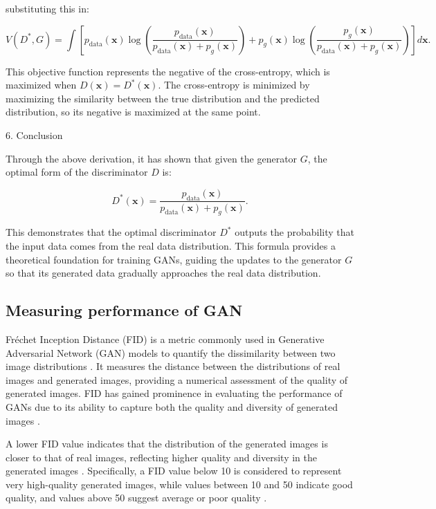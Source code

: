 substituting this in:

\begin{equation}
    V(D^*, G) = \int \left[ p_{\text{data}}(\mathbf{x}) \log \left( \frac{p_{\text{data}}(\mathbf{x})}{p_{\text{data}}(\mathbf{x}) + p_g(\mathbf{x})} \right) + p_g(\mathbf{x}) \log \left( \frac{p_g(\mathbf{x})}{p_{\text{data}}(\mathbf{x}) + p_g(\mathbf{x})} \right) \right] d\mathbf{x}.
\end{equation}

This objective function represents the negative of the cross-entropy, which is maximized when \( D(\mathbf{x}) = D^*(\mathbf{x}) \). The cross-entropy is minimized by maximizing the similarity between the true distribution and the predicted distribution, so its negative is maximized at the same point.

6. Conclusion

Through the above derivation, it has shown that given the generator \( G \), the optimal form of the discriminator \( D \) is:

\begin{equation}
    D^*(\mathbf{x}) = \frac{p_{\text{data}}(\mathbf{x})}{p_{\text{data}}(\mathbf{x}) + p_g(\mathbf{x})}.
\end{equation}

This demonstrates that the optimal discriminator \( D^* \) outputs the probability that the input data comes from the real data distribution. This formula provides a theoretical foundation for training GANs, guiding the updates to the generator \( G \) so that its generated data gradually approaches the real data distribution.


\subsection*{Measuring performance of GAN}


Fréchet Inception Distance (FID) is a metric commonly used in Generative Adversarial Network (GAN) models 
to quantify the dissimilarity between two image distributions \citep{10.48550/arxiv.2203.06026}. 
It measures the distance between the distributions of real images and generated images, providing 
a numerical assessment of the quality of generated images. FID has gained prominence in evaluating 
the performance of GANs due to its ability to capture both the quality and diversity of generated images \citep{10.3390/app12157599}.

A lower FID value indicates that the distribution of the generated images is closer to that of real images, 
reflecting higher quality and diversity in the generated images \citep{10.1117/12.2673366}. 
Specifically, a FID value below 10 is considered to represent very high-quality generated images, 
while values between 10 and 50 indicate good quality, and values above 50 suggest average or poor quality \citep{10.1117/12.2673366}.


